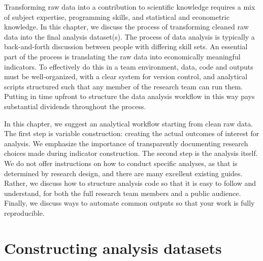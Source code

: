 
\begin{fullwidth}


Transforming raw data into a contribution to scientific knowledge
requires a mix of subject expertise, programming skills,
and statistical and econometric knowledge.
In this chapter, we discuss the process of transforming 
cleaned raw data into the final analysis dataset(s).
The process of data analysis is typically
a back-and-forth discussion between people
with differing skill sets.
An essential part of the process is translating the
raw data into economically meaningful indicators.
To effectively do this in a team environment,
data, code and outputs must be well-organized,
with a clear system for version control,
and analytical scripts structured such that any member of the research team can run them.
Putting in time upfront to structure the data analysis workflow
in this way pays substantial dividends throughout the process.

In this chapter, we suggest an analytical workflow
starting from clean raw data.
The first step is variable construction:
creating the actual outcomes of interest for analysis.
We emphasize the importance of transparently documenting research choices made during indicator construction.
The second step is the analysis itself.
We do not offer instructions on how to conduct specific analyses,
as that is determined by research design,
and there are many excellent existing guides.
Rather, we discuss how to structure analysis code
so that it is easy to follow and understand,
for both the full research team members and a public audience.
Finally, we discuss ways to automate common outputs
so that your work is fully reproducible.

\end{fullwidth}


\section{Constructing analysis datasets}

